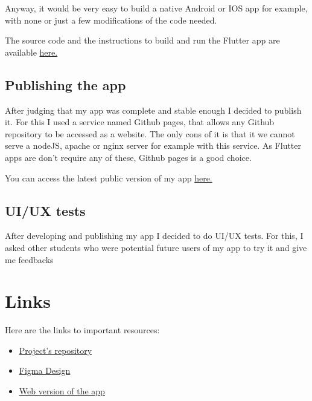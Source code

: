\documentclass[]{article}
\begin{document}
	Anyway, it would be very easy to build a native Android or IOS app for example, with none or just a few modifications of the code needed.\linebreak
	
	The source code and the instructions to build and run the Flutter app are available \href{https://github.com/Logan-Developer/ui-lahumbert/tree/main/FinalProject/note_taking_app}{here.}
	
	\subsection{Publishing the app}
	
	After judging that my app was complete and stable enough I decided to publish it.\linebreak
	For this I used a service named Github pages, that allows any Github repository to be accessed as a website.\linebreak
	The only cons of it is that it we cannot serve a nodeJS, apache or nginx server for example with this service.\linebreak
	As Flutter apps are don't require any of these, Github pages is a good choice.\linebreak
	
	You can access the latest public version of my app \href{https://class-snap.tech/}{here.}
	
	\pagebreak
	
	\subsection{UI/UX tests}
	
	After developing and publishing my app I decided to do UI/UX tests.\linebreak
	For this, I asked other students who were potential future users of my app to try it and give me feedbacks 
	
	\pagebreak
	
	\section{Links}
	
	Here are the links to important resources:
	
	\begin{itemize}
		\item \href{https://github.com/Logan-Developer/ui-lahumbert/tree/main/FinalProject}{Project's repository} 
		
		\item \href{https://www.figma.com/file/ZOlxVGHb9fLdk5uUODqMU9/CSCI-337---Notes-Taking-App?type=design&node-id=54810%3A34721&mode=design&t=fS6KJvRgsvtgz9cf-1}{Figma Design}
		
		\item
		\href{https://class-snap.tech/}{Web version of the app}
	\end{itemize}
	
	\label{LastPage}
\end{document}
